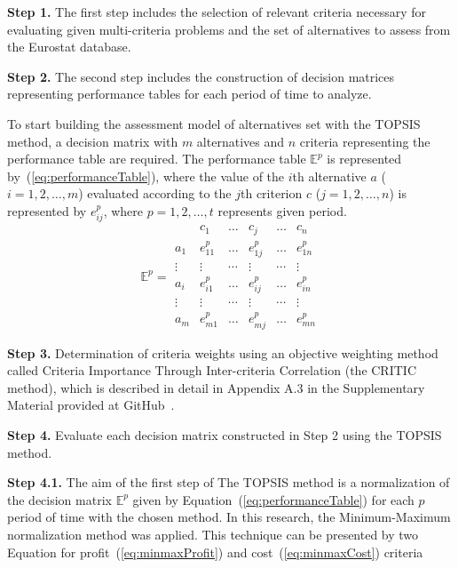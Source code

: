 \documentclass[5p,times]{elsarticle}
\begin{document}
\textbf{Step 1.} The first step includes the selection of relevant criteria necessary for evaluating given multi-criteria problems and the set of alternatives to assess from the Eurostat database.

\textbf{Step 2.} The second step includes the construction of decision matrices representing performance tables for each period of time to analyze.

To start building the assessment model of alternatives set with the TOPSIS method, a decision matrix with $m$ alternatives and $n$ criteria representing the performance table are required. The performance table $\mathbb{E}^{p}$ is represented by~(\ref{eq:performanceTable}), where the value of the $i$th alternative $a$ ($i = 1, 2, \ldots, m$) evaluated according to the $j$th criterion $c$ ($j = 1, 2, \ldots, n$) is represented by $e_{ij}^{p}$, where $p = 1, 2, \ldots, t$ represents given period. 
\begin{equation}
    \mathbb{E}^{p} = \begin{array}{l|lllll}
     & c_{1} & \ldots & c_{j} & \ldots & c_{n} \\ \hline
    a_{1} & e_{11}^{p} & \ldots & e_{1j}^{p} & \ldots & e_{1n}^{p} \\
    \vdots & \vdots & \cdots & \vdots & \cdots & \vdots \\
    a_{i} & e_{i1}^{p} & \ldots & e_{ij}^{p} & \ldots & e_{in}^{p} \\
    \vdots & \vdots & \cdots & \vdots & \cdots & \vdots \\
    a_{m} & e_{m1}^{p} & \ldots & e_{mj}^{p} & \ldots & e_{mn}^{p} \label{eq:performanceTable}
\end{array}
\end{equation}

\textbf{Step 3.} Determination of criteria weights using an objective weighting method called Criteria Importance Through Inter-criteria Correlation (the CRITIC method), which is described in detail in Appendix A.3 in the Supplementary Material provided at GitHub~\cite{dariagithub2022}.

\textbf{Step 4.} Evaluate each decision matrix constructed in Step 2 using the TOPSIS method.

\textbf{Step 4.1.} The aim of the first step of The TOPSIS method is a normalization of the decision matrix $\mathbb{E}^{p}$ given by Equation~(\ref{eq:performanceTable}) for each $p$ period of time with the chosen method. In this research, the Minimum-Maximum normalization method was applied. This technique can be presented by two Equation for profit~(\ref{eq:minmaxProfit}) and cost~(\ref{eq:minmaxCost}) criteria
\end{document}

